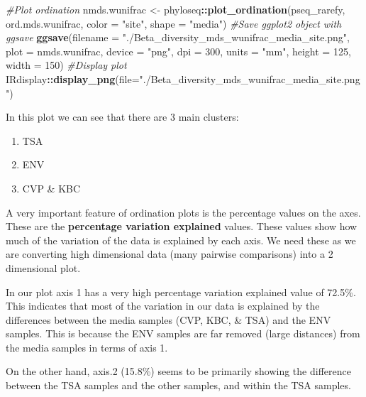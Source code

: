 \documentclass[
]{book}
\newenvironment{Shaded}{\begin{snugshade}}{\end{snugshade}}
\newcommand{\AttributeTok}[1]{\textcolor[rgb]{0.13,0.29,0.53}{#1}}
\newcommand{\CommentTok}[1]{\textcolor[rgb]{0.56,0.35,0.01}{\textit{#1}}}
\newcommand{\DecValTok}[1]{\textcolor[rgb]{0.00,0.00,0.81}{#1}}
\newcommand{\FunctionTok}[1]{\textcolor[rgb]{0.13,0.29,0.53}{\textbf{#1}}}
\newcommand{\NormalTok}[1]{#1}
\newcommand{\OtherTok}[1]{\textcolor[rgb]{0.56,0.35,0.01}{#1}}
\newcommand{\SpecialCharTok}[1]{\textcolor[rgb]{0.81,0.36,0.00}{\textbf{#1}}}
\newcommand{\StringTok}[1]{\textcolor[rgb]{0.31,0.60,0.02}{#1}}
\providecommand{\tightlist}{%
  \setlength{\itemsep}{0pt}\setlength{\parskip}{0pt}}
\begin{document}
\begin{Shaded}
\begin{Highlighting}[]
\CommentTok{\#Plot ordination}
\NormalTok{nmds.wunifrac }\OtherTok{\textless{}{-}}\NormalTok{ phyloseq}\SpecialCharTok{::}\FunctionTok{plot\_ordination}\NormalTok{(pseq\_rarefy, ord.mds.wunifrac,}
                                   \AttributeTok{color =} \StringTok{"site"}\NormalTok{, }\AttributeTok{shape =} \StringTok{"media"}\NormalTok{)}
\CommentTok{\#Save ggplot2 object with ggsave}
\FunctionTok{ggsave}\NormalTok{(}\AttributeTok{filename =} \StringTok{"./Beta\_diversity\_mds\_wunifrac\_media\_site.png"}\NormalTok{, }\AttributeTok{plot =}\NormalTok{ nmds.wunifrac,}
       \AttributeTok{device =} \StringTok{"png"}\NormalTok{, }\AttributeTok{dpi =} \DecValTok{300}\NormalTok{, }\AttributeTok{units =} \StringTok{"mm"}\NormalTok{, }\AttributeTok{height =} \DecValTok{125}\NormalTok{, }\AttributeTok{width =} \DecValTok{150}\NormalTok{)}
\CommentTok{\#Display plot}
\NormalTok{IRdisplay}\SpecialCharTok{::}\FunctionTok{display\_png}\NormalTok{(}\AttributeTok{file=}\StringTok{"./Beta\_diversity\_mds\_wunifrac\_media\_site.png"}\NormalTok{)}
\end{Highlighting}
\end{Shaded}

In this plot we can see that there are 3 main clusters:

\begin{enumerate}
\def\labelenumi{\arabic{enumi}.}
\tightlist
\item
  TSA
\item
  ENV
\item
  CVP \& KBC
\end{enumerate}

A very important feature of ordination plots is the percentage values on the axes.
These are the \textbf{percentage variation explained} values.
These values show how much of the variation of the data is explained by each axis.
We need these as we are converting high dimensional data (many pairwise comparisons) into a 2 dimensional plot.

In our plot axis 1 has a very high percentage variation explained value of 72.5\%.
This indicates that most of the variation in our data is explained by the differences between the media samples (CVP, KBC, \& TSA) and the ENV samples.
This is because the ENV samples are far removed (large distances) from the media samples in terms of axis 1.

On the other hand, axis.2 (15.8\%) seems to be primarily showing the difference between the TSA samples and the other samples, and within the TSA samples.
\end{document}
